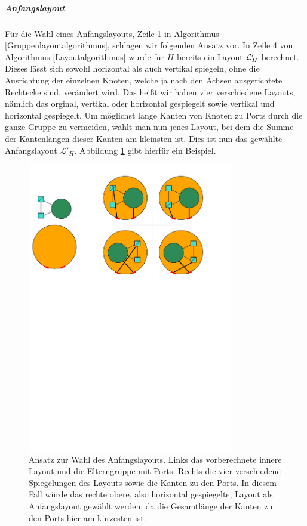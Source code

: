 \subparagraph{Anfangslayout}

Für die Wahl eines Anfangslayouts, Zeile 1 in Algorithmus \ref{Gruppenlayoutalgorithmus}, schlagen wir folgenden Ansatz vor.
In Zeile 4 von Algorithmus \ref{Layoutalgorithmus} wurde für $H$ bereits ein Layout $\mathcal{L}'_H$ berechnet. 
Dieses lässt sich sowohl horizontal als auch vertikal spiegeln, ohne die Ausrichtung der einzelnen Knoten, welche ja nach den Achsen ausgerichtete Rechtecke sind, verändert wird.
Das heißt wir haben vier verschiedene Layouts, nämlich das orginal, vertikal oder horizontal gespiegelt sowie vertikal und horizontal gespiegelt.
Um möglichst lange Kanten von Knoten zu Ports durch die ganze Gruppe zu vermeiden, wählt man nun jenes Layout,
bei dem die Summe der Kantenlängen dieser Kanten am kleinsten ist. Dies ist nun  das gewählte Anfangslayout $\mathcal{L}'_H$.
Abbildung \ref{f:Anfangslayout} gibt hierfür ein Beispiel.

\begin{figure}[h!]
\begin{center} 
  \includegraphics[width=0.8\textwidth]{Pics/Anfangslayout.pdf}
  \caption{Ansatz zur Wahl des Anfangslayouts. Links das vorberechnete innere Layout und die Elterngruppe mit Ports. Rechts die vier verschiedene Spiegelungen des Layouts sowie die Kanten zu den Ports.
  In diesem Fall würde das rechte obere, also horizontal gespiegelte, Layout als Anfangslayout gewählt werden, da die Gesamtlänge der Kanten zu den Ports hier am kürzesten ist.}
  \label{f:Anfangslayout}
\end{center}
\end{figure}

